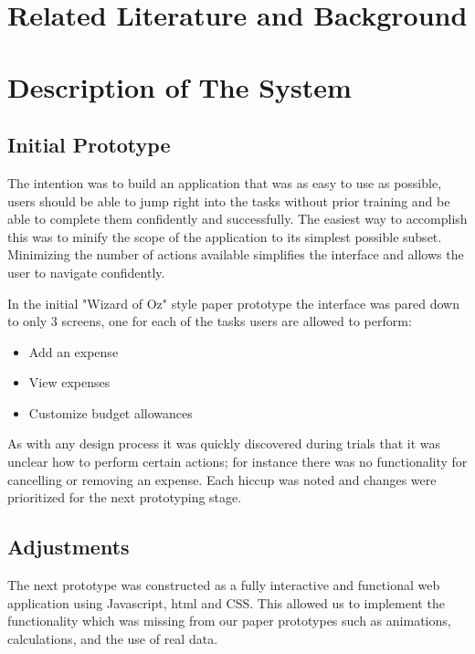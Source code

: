\documentclass{chi2011}
\begin{document}
\section{Related Literature and Background}
\section{Description of The System}

    \subsection{Initial Prototype}

    The intention was to build an application that was as easy to use as
    possible, users should be able to jump right into the tasks without prior
    training and be able to complete them confidently and successfully. The
    easiest way to accomplish this was to minify the scope of the application
    to its simplest possible subset. Minimizing the number of actions available
    simplifies the interface and allows the user to navigate confidently.

    In the initial "Wizard of Oz" style paper prototype the interface was pared
    down to only 3 screens, one for each of the tasks users are allowed to
    perform:

    \begin{itemize}[noitemsep]
        \item Add an expense
        \item View expenses
        \item Customize budget allowances
    \end{itemize}

    As with any design process it was quickly discovered during trials that
    it was unclear how to perform certain actions; for instance there was no
    functionality for cancelling or removing an expense. Each hiccup was noted
    and changes were prioritized for the next prototyping stage.

    \subsection{Adjustments}
    
    The next prototype was constructed as a fully interactive and functional
    web application using Javascript, html and CSS. This allowed us to
    implement the functionality which was missing from our paper prototypes
    such as animations, calculations, and the use of real data.
\end{document}
